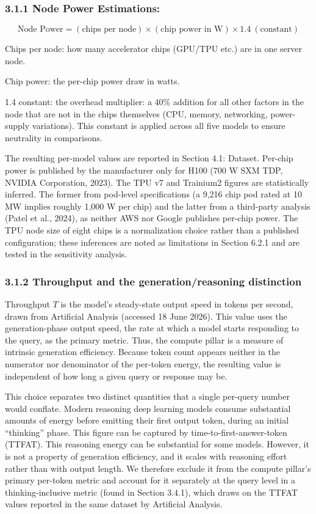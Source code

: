 \documentclass[11pt]{article}
\begin{document}
\subsubsection*{3.1.1 Node Power Estimations:}

\[
\text{Node Power} = (\text{chips per node}) \times (\text{chip power in W}) \times 1.4\ (\text{constant})
\]

Chips per node: how many accelerator chips (GPU/TPU etc.) are in one server node.

Chip power: the per-chip power draw in watts.

1.4 constant: the overhead multiplier: a 40\% addition for all other factors in the node that are not in the chips themselves (CPU, memory, networking, power-supply variations). This constant is applied across all five models to ensure neutrality in comparisons.

The resulting per-model values are reported in Section 4.1: Dataset. Per-chip power is published by the manufacturer only for H100 (700 W SXM TDP, NVIDIA Corporation, 2023). The TPU v7 and Trainium2 figures are statistically inferred. The former from pod-level specifications (a 9,216 chip pod rated at 10 MW implies roughly 1,000 W per chip) and the latter from a third-party analysis (Patel et al., 2024), as neither AWS nor Google publishes per-chip power. The TPU node size of eight chips is a normalization choice rather than a published configuration; these inferences are noted as limitations in Section 6.2.1 and are tested in the sensitivity analysis.

\subsubsection*{3.1.2 Throughput and the generation/reasoning distinction}

Throughput $T$ is the model's steady-state output speed in tokens per second, drawn from Artificial Analysis (accessed 18 June 2026). This value uses the generation-phase output speed, the rate at which a model starts responding to the query, as the primary metric. Thus, the compute pillar is a measure of intrinsic generation efficiency. Because token count appears neither in the numerator nor denominator of the per-token energy, the resulting value is independent of how long a given query or response may be.

This choice separates two distinct quantities that a single per-query number would conflate. Modern reasoning deep learning models consume substantial amounts of energy before emitting their first output token, during an initial ``thinking'' phase. This figure can be captured by time-to-first-answer-token (TTFAT). This reasoning energy can be substantial for some models. However, it is not a property of generation efficiency, and it scales with reasoning effort rather than with output length. We therefore exclude it from the compute pillar's primary per-token metric and account for it separately at the query level in a thinking-inclusive metric (found in Section 3.4.1), which draws on the TTFAT values reported in the same dataset by Artificial Analysis.
\end{document}
